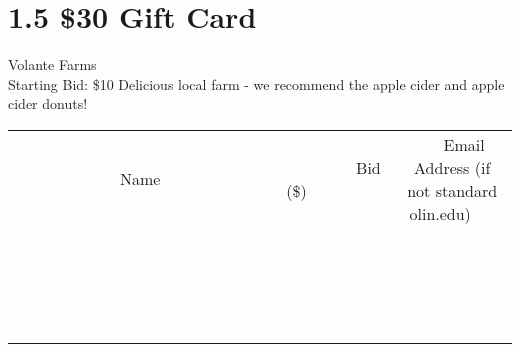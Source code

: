 \documentclass[11pt]{article}
\begin{document}
\section*{1.5 \$30 Gift Card}
Volante Farms
\\
Starting Bid: \$10
\newline
Delicious local farm - we recommend the apple cider and apple cider donuts!
\\[3ex]
\begin{tabular}{c c c}
~~~~~~~~~~~~~Name~~~~~~~~~~~~~ & ~~~~~~~~~Bid (\$)~~~~~~~~~  & ~~~Email Address (if not standard olin.edu)~~~\\
 & & \\
\hline
 & & \\
\hline
 & & \\
\hline
 & & \\
\hline
 & & \\
\hline
 & & \\
\hline
 & & \\
\hline
 & & \\
\hline
 & & \\
\hline
 & & \\
\hline
 & & \\
\hline
 & & \\
\hline
 & & \\
\hline
 & & \\
\hline
 & & \\
\hline
 & & \\
\hline
 & & \\
\hline
 & & \\
\hline
 & & \\
\hline
\end{tabular}
\newpage
\end{document}
